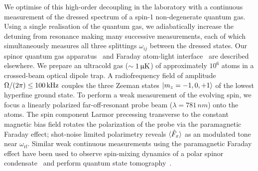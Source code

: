 \documentclass[aps,prl,reprint,superscriptaddress,floatfix]{revtex4-1}
\begin{document}


We optimise of this high-order decoupling in the laboratory with a continuous measurement of the dressed spectrum of a spin-1 non-degenerate quantum gas.
Using a single realisation of the quantum gas, we adiabatically increase the detuning from resonance making many successive measurements, each of which simultaneously measures all three splittings $\omega_{ij}$ between the dressed states.
Our spinor quantum gas apparatus~\cite{wood_magnetic_2015} and Faraday atom-light interface~\cite{jasperse_magic-wavelength_2017} are described elsewhere.
We prepare an ultracold gas ($\sim \unit[1]{\upmu K}$) of approximately $10^6$ \Rb atoms in a crossed-beam optical dipole trap.
A radiofrequency field of amplitude $\Omega/(2\pi) \leq \unit[100]{kHz}$ couples the three Zeeman states $\vert m_z=-1,0,+1 \rangle $ of the lowest hyperfine ground state.
To perform a weak measurement of the evolving spin, we focus a linearly polarized far-off-resonant probe beam ($\lambda=781\,nm$) onto the atoms.
The spin component Larmor precessing transverse to the constant magnetic bias field rotates the polarization of the probe via the paramagnetic Faraday effect; shot-noise limited polarimetry reveals $\langle \hat{F}_x \rangle$ as an modulated tone near $\omega_\text{rf}$.
Similar weak continuous measurements using the paramagnetic Faraday effect have been used to observe spin-mixing dynamics of a polar spinor condensate~\cite{liu_quantum_2009} and perform quantum state tomography~\cite{smith_continuous_2004,*smith_efficient_2006}.
\end{document}
